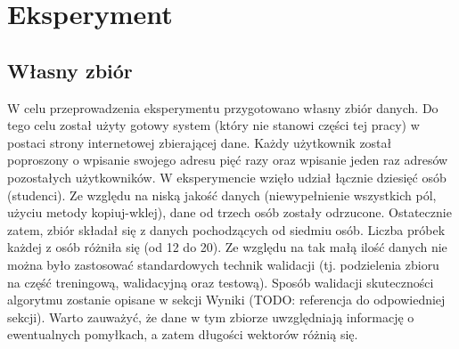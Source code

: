 \chapter{Eksperyment}
\section{Własny zbiór}
W celu przeprowadzenia eksperymentu przygotowano własny zbiór danych. Do tego celu został użyty gotowy system (który nie stanowi części tej pracy) w postaci strony internetowej zbierającej dane. Każdy użytkownik został poproszony o wpisanie swojego adresu pięć razy oraz wpisanie jeden raz adresów pozostałych użytkowników. W eksperymencie wzięło udział łącznie dziesięć osób (studenci). Ze względu na niską jakość danych (niewypełnienie wszystkich pól, użyciu metody kopiuj-wklej), dane od trzech osób zostały odrzucone. Ostatecznie zatem, zbiór składał się z danych pochodzących od siedmiu osób. Liczba próbek każdej z osób różniła się (od 12 do 20). Ze względu na tak małą ilość danych nie można było zastosować standardowych technik walidacji (tj. podzielenia zbioru na część treningową, walidacyjną oraz testową). Sposób walidacji skuteczności algorytmu zostanie opisane w sekcji Wyniki (TODO: referencja do odpowiedniej sekcji). Warto zauważyć, że dane w tym zbiorze uwzględniają informację o ewentualnych pomyłkach, a zatem długości wektorów różnią się.
